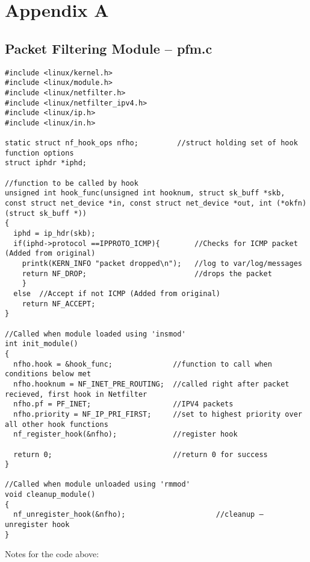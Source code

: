 \documentclass[a4paper,12pt]{article}
\begin{document}
\newpage
\section{Appendix A}
\label{ch:AppA}
\subsection{Packet Filtering Module -- pfm.c}
\begin{verbatim}
#include <linux/kernel.h>
#include <linux/module.h>
#include <linux/netfilter.h>
#include <linux/netfilter_ipv4.h>
#include <linux/ip.h>
#include <linux/in.h>

static struct nf_hook_ops nfho;         //struct holding set of hook function options
struct iphdr *iphd;

//function to be called by hook
unsigned int hook_func(unsigned int hooknum, struct sk_buff *skb, const struct net_device *in, const struct net_device *out, int (*okfn)(struct sk_buff *))
{
  iphd = ip_hdr(skb);
  if(iphd->protocol ==IPPROTO_ICMP){		//Checks for ICMP packet (Added from original)
  	printk(KERN_INFO "packet dropped\n");   //log to var/log/messages
  	return NF_DROP;                         //drops the packet
	}
  else	//Accept if not ICMP (Added from original)
	return NF_ACCEPT;
}

//Called when module loaded using 'insmod'
int init_module()
{
  nfho.hook = &hook_func;              //function to call when conditions below met
  nfho.hooknum = NF_INET_PRE_ROUTING;  //called right after packet recieved, first hook in Netfilter
  nfho.pf = PF_INET;                   //IPV4 packets
  nfho.priority = NF_IP_PRI_FIRST;     //set to highest priority over all other hook functions
  nf_register_hook(&nfho);             //register hook

  return 0;                            //return 0 for success
}

//Called when module unloaded using 'rmmod'
void cleanup_module()
{
  nf_unregister_hook(&nfho);                     //cleanup – unregister hook
}
\end{verbatim}
\noindent *Notes for the code above:
\end{document}
